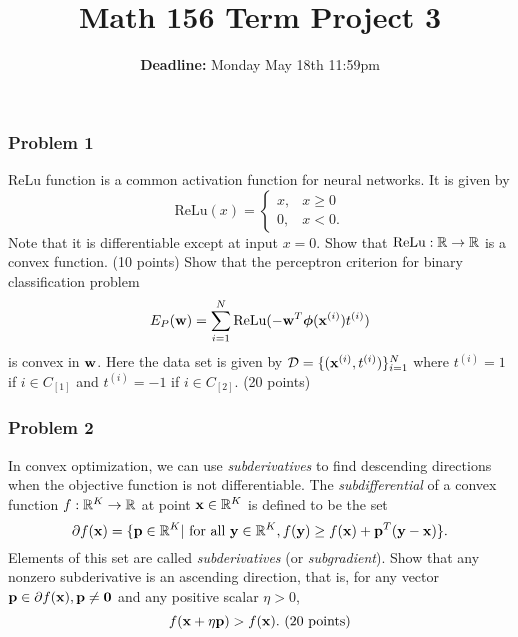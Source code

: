 \documentclass[12pt,a4paper]{article}
\renewcommand{\v}[1]{\ifmmode\mathbf{#1}\fi}
\newcommand{\ra}[1]{\ifnum #1=1\rightarrow\fi\ifnum #1=2\Rightarrow\fi\ifnum #1=3\Rrightarrow\fi\ifnum #1=4\rightrightarrows\fi\ifnum #1=5\rightleftarrows\fi\ifnum #1=6\mapsto\fi\ifnum #1=7\iffalse\fi\fi\ifnum #1=8\twoheadrightarrow\fi\ifnum #1=9\rightharpoonup\fi\ifnum #1=0\rightharpoondown\fi}
\renewcommand{\l}{\left}\renewcommand{\r}{\right}
\newcommand{\SUM}[2]{\sum\limits_{#1}^{#2}}
\newcommand{\R}{\ifmmode\mathbb R\fi}
\newcommand{\ReLu}{\text{ReLu}}
\newcommand{\RELU}{\text{\textbf{ReLu}}}
\begin{document}
\title{Math 156 Term Project 3}
\author{\textbf{Deadline:} Monday May 18th 11:59pm}
\date{}
\maketitle

\subsubsection*{Problem 1}
ReLu function is a common activation function for neural networks. It is given by
\begin{equation*}
	\ReLu(x) = \l\{ 
		\begin{array}{ll}
		x, & x \geq 0\\
		0, & x < 0.
		\end{array}
		\r.
\end{equation*}
Note that it is differentiable except at input $x = 0$. Show that $\ReLu: \R \ra1 \R$ is a convex function. (10 points) Show that the perceptron criterion for binary classification problem
\begin{equation*}
	E_P(\v w) = \SUM{i=1}N \ReLu(- \v w^T \boldsymbol\phi(\v x^{(i)}) t^{(i)})
\end{equation*}
is convex in $\v w$. Here the data set is given by $\mathcal D = \{(\v x^{(i)}, t^{(i)})\}_{i=1}^N$ where $t^{(i)} = 1$ if $i \in C_{[1]}$ and $t^{(i)} = -1$ if $i \in C_{[2]}$. (20 points)


\subsubsection*{Problem 2}
In convex optimization, we can use \textit{subderivatives} to find descending directions when the objective function is not differentiable. The \textit{subdifferential} of a convex function $f: \R^K \ra1 \R$ at point $\v x\in \R^K$ is defined to be the set 
\begin{equation*}
	\partial f(\v x) = \{ \v p \in \R^K \vert \text{ for all } \v y \in \R^K, f(\v y) \geq f(\v x) + \v p^T (\v y - \v x) \}.
\end{equation*}
Elements of this set are called \textit{subderivatives} (or \textit{subgradient}). Show that any nonzero subderivative is an ascending direction, that is, for any vector $\v p \in \partial f(\v x), \v p \neq \v 0$ and any positive scalar $\eta > 0$,  
\begin{equation*}
	f(\v x + \eta\v p) > f(\v x). \text{ (20 points)}
\end{equation*}
\end{document}
